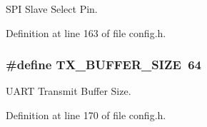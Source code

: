 S\-P\-I Slave Select Pin. 



Definition at line 163 of file config.\-h.

\hypertarget{group__config_ga9ab33647617098646990fe263600b650}{
\subsubsection[{T\-X\-\_\-\-B\-U\-F\-F\-E\-R\-\_\-\-S\-I\-Z\-E}]{\setlength{\rightskip}{0pt plus 5cm}\#define T\-X\-\_\-\-B\-U\-F\-F\-E\-R\-\_\-\-S\-I\-Z\-E~64}}\label{group__config_ga9ab33647617098646990fe263600b650}


U\-A\-R\-T Transmit Buffer Size. 



Definition at line 170 of file config.\-h.

